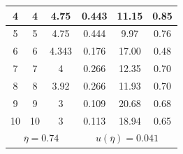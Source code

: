 \documentclass[12pt]{article}
\begin{document}
\begin{table}[h]
\begin{tabular}{|c|c|c|c|c|c|}
4                                                    & 4                                                  & 4.75                                                            & 0.443                                                      & 11.15                                                             &  0.85\\ \hline
5                                                    & 5                                                  & 4.75                                                            & 0.444                                                      & 9.97                                                              &  0.76\\ \hline
6                                                    & 6                                                  & 4.343                                                           & 0.176                                                      & 17.00                                                             & 0.48\\ \hline
7                                                    & 7                                                  & 4                                                               & 0.266                                                      & 12.35                                                             & 0.70\\ \hline
8                                                    & 8                                                  & 3.92                                                            & 0.266                                                      & 11.93                                                             &  0.70\\ \hline
9                                                    & 9                                                  & 3                                                               & 0.109                                                      & 20.68                                                             & 0.68\\ \hline
10                                                   & 10                                                 & 3                                                               & 0.113                                                      & 18.94                                                             & 0.65\\ \hline
 \multicolumn{3}{|c|}{$\overline{\eta} = 0.74$}& \multicolumn{3}{|c|}{$u(\overline{\eta}) = 0.041$}\\\hline
\end{tabular}
\end{table}
\end{document}
